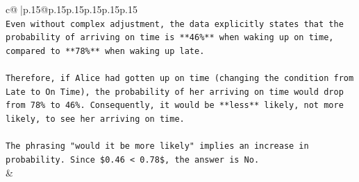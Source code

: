 \documentclass{article}
\begin{document}
{\begin{supertabular}{c@{$\;$}|p{.15\linewidth}@{}p{.15\linewidth}p{.15\linewidth}p{.15\linewidth}p{.15\linewidth}p{.15\linewidth}}
{{{\\ 
\texttt{Even without complex adjustment, the data explicitly states that the probability of arriving on time is **46\%** when waking up on time, compared to **78\%** when waking up late.} \\
\\ 
\texttt{Therefore, if Alice had gotten up on time (changing the condition from Late to On Time), the probability of her arriving on time would drop from 78\% to 46\%. Consequently, it would be **less** likely, not more likely, to see her arriving on time.} \\
\\ 
\texttt{The phrasing "would it be more likely" implies an increase in probability. Since \$0.46 < 0.78\$, the answer is No.} \\
            }
        }
    }
    & \\ \\


\end{supertabular}}
\end{document}
